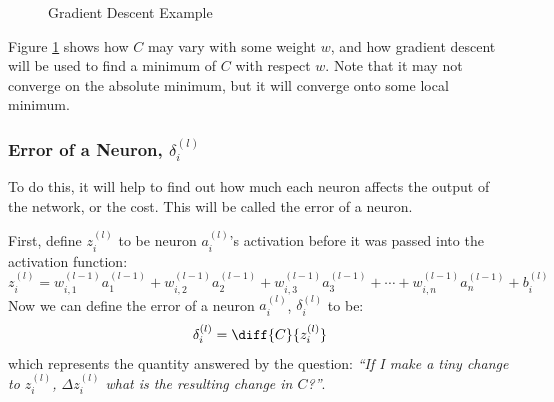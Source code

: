 \documentclass[12pt]{report}
\begin{document}
\begin{figure}[H]
\centering
{}
\caption{Gradient Descent Example}\label{fig:gradientdescent}
\end{figure}
Figure \ref{fig:gradientdescent} shows how $C$ may vary with some weight $w$, and how gradient descent will be used to find a minimum of $C$ with respect $w$. Note that it may not converge on the absolute minimum, but it will converge onto some local minimum. 

\subsubsection{Error of a Neuron, ${\delta}^{\left(l\right)}_i$}
To do this, it will help to find out how much each neuron affects the output of the network, or the cost. This will be called the error of a neuron.

First, define $z^{\left(l\right)}_i$ to be neuron $a^{\left(l\right)}_i$'s activation before it was passed into the activation function:
\begin{equation}\label{eq:zdefinition}
    z^{\left(l\right)}_i=w^{\left(l-1\right)}_{i,1}a^{\left(l-1\right)}_1+w^{\left(l-1\right)}_{i,2}a^{\left(l-1\right)}_2+w^{\left(l-1\right)}_{i,3}a^{\left(l-1\right)}_3+\cdots +w^{\left(l-1\right)}_{i,n}a^{\left(l-1\right)}_n+b^{\left(l\right)}_i
\end{equation}
Now we can define the error of a neuron $a^{\left(l\right)}_i$, ${\delta}^{\left(l\right)}_i$ to be:
\begin{equation}
    {\delta}^{\left(l\right)}_i=\diff{C}{z^{\left(l\right)}_i}
\end{equation}
which represents the quantity answered by the question: \textit{``If I make a tiny change to $z^{\left(l\right)}_i$, $\Delta z^{\left(l\right)}_i$ what is the resulting change in $C$?''}.
\end{document}
